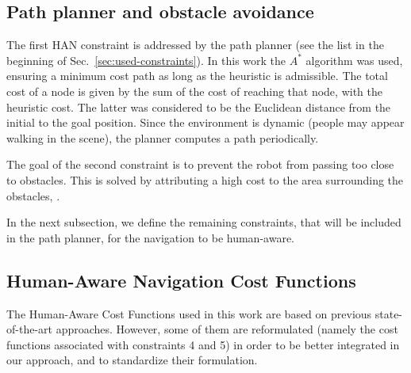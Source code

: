 \documentclass[5p,time]{elsarticle}
\begin{document}
\subsection{Path planner and obstacle avoidance}\label{sec:path_planer}
The first HAN constraint is addressed by the path planner (see the list in the beginning of Sec.~\ref{sec:used-constraints}). In this work the $A^*$ algorithm \cite{hart:TSSC1968} was used, ensuring a minimum cost path as long as the heuristic is admissible. The total cost of a node is given by the sum of the cost of reaching that node, with the heuristic cost. The latter was considered to be the Euclidean distance from the initial to the goal position. Since the environment is dynamic (people may appear walking in the scene), the planner computes a path periodically.

The goal of the second constraint is to prevent the robot from passing too close to obstacles. This is solved by attributing a high cost to the area surrounding the obstacles, \cite{article:marder:2010}.

In the next subsection, we define the remaining constraints, that will be included in the path planner, for the navigation to be human-aware.

\subsection{Human-Aware Navigation Cost Functions}\label{sec:human_aware_constraints}
The Human-Aware Cost Functions used in this work are based on previous state-of-the-art approaches. However, some of them are reformulated (namely the cost functions associated with constraints 4 and 5) in order to be better integrated in our approach, and to standardize their formulation.
\end{document}
